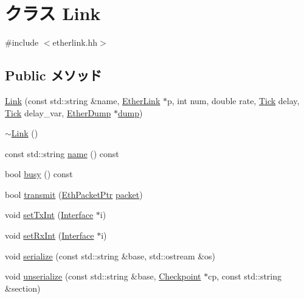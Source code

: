 \hypertarget{classEtherLink_1_1Link}{
\section{クラス Link}
\label{classEtherLink_1_1Link}
}


{\ttfamily \#include $<$etherlink.hh$>$}\subsection*{Public メソッド}
\begin{DoxyCompactItemize}
\item 
\hyperlink{classEtherLink_1_1Link_a008072dca8221a9e8633f7a692bf8529}{Link} (const std::string \&name, \hyperlink{classEtherLink}{EtherLink} $\ast$p, int num, double rate, \hyperlink{base_2types_8hh_a5c8ed81b7d238c9083e1037ba6d61643}{Tick} delay, \hyperlink{base_2types_8hh_a5c8ed81b7d238c9083e1037ba6d61643}{Tick} delay\_\-var, \hyperlink{classEtherDump}{EtherDump} $\ast$\hyperlink{classEtherLink_1_1Link_ad5a0f1baca11c9598fdb6996bd03ac8c}{dump})
\item 
\hyperlink{classEtherLink_1_1Link_a2b6c85429ae38a687fbffb017cc773b9}{$\sim$Link} ()
\item 
const std::string \hyperlink{classEtherLink_1_1Link_a6490f765a824ced1cc94979609fe7e07}{name} () const 
\item 
bool \hyperlink{classEtherLink_1_1Link_ab4dfde754c39017408feef7294770646}{busy} () const 
\item 
bool \hyperlink{classEtherLink_1_1Link_a740c6672cf526da9b2acc1f438ac11c7}{transmit} (\hyperlink{classRefCountingPtr}{EthPacketPtr} \hyperlink{classEtherLink_1_1Link_a8bd0d3f7eb9e8d7189c7027028a5fac0}{packet})
\item 
void \hyperlink{classEtherLink_1_1Link_a47597f43046767553e7abc1b22851548}{setTxInt} (\hyperlink{classEtherLink_1_1Interface}{Interface} $\ast$i)
\item 
void \hyperlink{classEtherLink_1_1Link_a26ca203034b85f4ca99fae85c5cf5819}{setRxInt} (\hyperlink{classEtherLink_1_1Interface}{Interface} $\ast$i)
\item 
void \hyperlink{classEtherLink_1_1Link_ab4138b21b48e3371a8e20df72b675a88}{serialize} (const std::string \&base, std::ostream \&os)
\item 
void \hyperlink{classEtherLink_1_1Link_a147c320e3d6506edf5587a40cd8e430d}{unserialize} (const std::string \&base, \hyperlink{classCheckpoint}{Checkpoint} $\ast$cp, const std::string \&section)
\end{DoxyCompactItemize}
